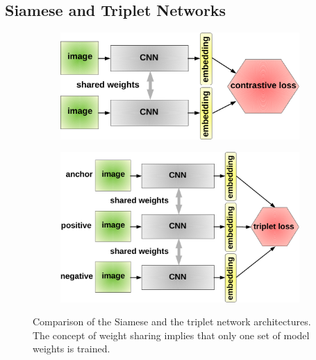 \subsection{Siamese and Triplet Networks}
\label{ssec:SiameseAndTripletNetworks}

\begin{figure}[t]
    \centering
    \begin{subfigure}[b]{0.49\textwidth}
        \centering
        \includegraphics[width=\textwidth]{figures/theoretical_foundations/siamese_architecture.pdf}
        \caption[]{}
    \end{subfigure}
    \hfill
    \begin{subfigure}[b]{0.49\textwidth}
        \centering
        \includegraphics[width=\textwidth]{figures/theoretical_foundations/triplet_architecture.pdf}
        \caption[]{}
    \end{subfigure}
    \caption[Contrastive and triplet loss]{Comparison of the Siamese  and the triplet  network architectures. The concept of weight sharing implies that only one set of model weights is trained.}
    \label{fig:SiameseAndTripletArchitectures}
\end{figure}


